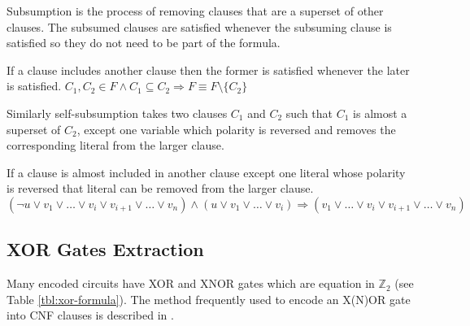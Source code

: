 Subsumption is the process of removing clauses that are a superset
of other clauses. The subsumed clauses are satisfied whenever
the subsuming clause is satisfied so they do not need to be part of
the formula.

\begin{myprop}[Subsumption]
  If a clause includes another clause then the former is satisfied whenever the
  later is satisfied.
  $C_1, C_2 \in F \land C_1 \subseteq C_2 \Rightarrow F \equiv F \setminus \{
  C_2 \}$
\end{myprop}

Similarly self-subsumption takes two clauses $C_1$ and $C_2$ such
that $C_1$ is almost a superset of $C_2$, except one variable which
polarity is reversed and removes the corresponding literal from
the larger clause.

\begin{myprop}
  If a clause is almost included in another clause except one literal whose
  polarity is reversed that literal can be removed from the larger clause.
  $(\neg u \lor v_1 \lor \ldots \lor v_i \lor v_{i+1} \lor \ldots \lor v_n)
    \land (u \lor v_1 \lor \ldots \lor v_i)
    \Rightarrow (v_1 \lor \ldots \lor v_i \lor v_{i+1} \lor \ldots \lor v_n)$
\end{myprop}


\subsection{XOR Gates Extraction}
\label{ssec:xor-extraction}

Many encoded circuits have XOR and XNOR gates which are equation
in $\mathbb{Z}_2$ (see Table \ref{tbl:xor-formula}). The method
frequently used to encode an X(N)OR gate into CNF clauses is described
in \cite{Roy_restoringcircuit}.

\begin{table}
  \centering

  \caption{XOR/XNOR gates}
  \label{tbl:xor-formula}
\end{table}


